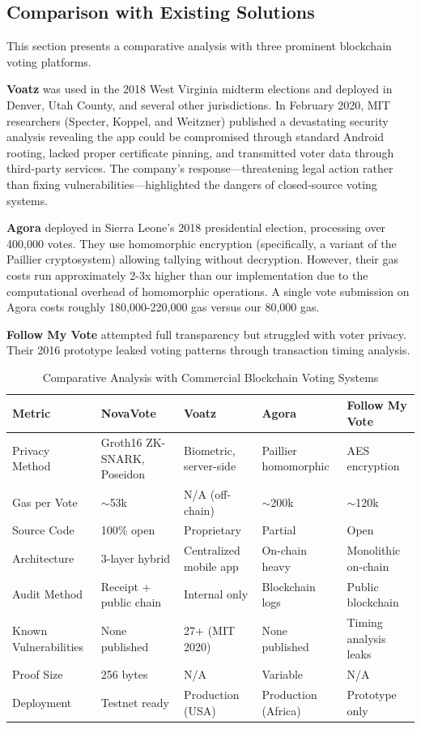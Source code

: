 \documentclass[conference]{IEEEtran}
\begin{document}
\subsection{Comparison with Existing Solutions}

This section presents a comparative analysis with three prominent blockchain voting platforms.

\textbf{Voatz} was used in the 2018 West Virginia midterm elections and deployed in Denver, Utah County, and several other jurisdictions. In February 2020, MIT researchers (Specter, Koppel, and Weitzner) published a devastating security analysis revealing the app could be compromised through standard Android rooting, lacked proper certificate pinning, and transmitted voter data through third-party services. The company's response---threatening legal action rather than fixing vulnerabilities---highlighted the dangers of closed-source voting systems.

\textbf{Agora} deployed in Sierra Leone's 2018 presidential election, processing over 400,000 votes. They use homomorphic encryption (specifically, a variant of the Paillier cryptosystem) allowing tallying without decryption. However, their gas costs run approximately 2-3x higher than our implementation due to the computational overhead of homomorphic operations. A single vote submission on Agora costs roughly 180,000-220,000 gas versus our 80,000 gas.

\textbf{Follow My Vote} attempted full transparency but struggled with voter privacy. Their 2016 prototype leaked voting patterns through transaction timing analysis.

\begin{table}[htbp]
\caption{Comparative Analysis with Commercial Blockchain Voting Systems}
\centering
\footnotesize
\begin{tabular}{|p{1.8cm}|p{1.3cm}|p{1.3cm}|p{1.3cm}|p{1.3cm}|}
\hline
\textbf{Metric} & \textbf{NovaVote} & \textbf{Voatz} & \textbf{Agora} & \textbf{Follow My Vote} \\
\hline
Privacy Method & Groth16 ZK-SNARK, Poseidon & Biometric, server-side & Paillier homomorphic & AES encryption \\
\hline
Gas per Vote & $\sim$53k & N/A (off-chain) & $\sim$200k & $\sim$120k \\
\hline
Source Code & 100\% open & Proprietary & Partial & Open \\
\hline
Architecture & 3-layer hybrid & Centralized mobile app & On-chain heavy & Monolithic on-chain \\
\hline
Audit Method & Receipt + public chain & Internal only & Blockchain logs & Public blockchain \\
\hline
Known Vulnerabilities & None published & 27+ (MIT 2020) & None published & Timing analysis leaks \\
\hline
Proof Size & 256 bytes & N/A & Variable & N/A \\
\hline
Deployment & Testnet ready & Production (USA) & Production (Africa) & Prototype only \\
\hline
\end{tabular}
\label{tab:comparison}
\end{table}
\end{document}
